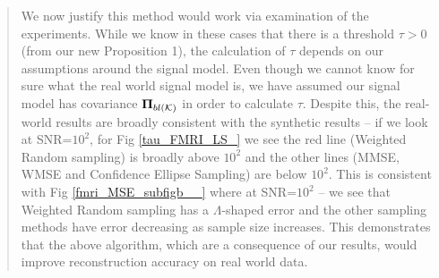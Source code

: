 \documentclass[11pt,onecolumn,journal]{IEEEtran}
\theoremstyle{definition}
\begin{document}
\begin{quote}
We now justify this method would work via examination of the experiments.
While we know in these cases that there is a threshold $\tau > 0$ (from our new Proposition 1), the calculation of $\tau$ depends on our assumptions around the signal model. Even though we cannot know for sure what the real world signal model is, we have assumed our signal model has covariance $\projbl$ in order to calculate $\tau$. Despite this, the real-world results are broadly consistent with the synthetic results -- if we look at SNR=$10^{2}$, for Fig \ref{tau_FMRI_LS_} we see the red line (Weighted Random sampling) is broadly above $10^2$ and the other lines (MMSE, WMSE and Confidence Ellipse Sampling) are below $10^2$. This is consistent with Fig \ref{fmri_MSE_subfigb__} where at SNR=$10^{2}$ -- we see that Weighted Random sampling has a $\Lambda$-shaped error and the other sampling methods have error decreasing as sample size increases. This demonstrates that the above algorithm, which are a consequence of our results, would improve reconstruction accuracy on real world data.






\end{quote}
\end{document}
